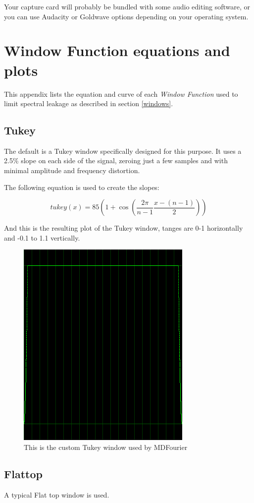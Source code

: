 \documentclass[10pt,a4paper]{report}
\begin{document}
\begin{appendices}
Your capture card will probably be bundled with some audio editing software, or you can use  Audacity\cite{audacity} or Goldwave\cite{goldwave} options depending on your operating system.

\chapter{Window Function equations and plots}
\label{windowfunctiondetails}

This appendix lists the equation and curve of each \textit{Window Function} used to limit spectral leakage as described in section \ref{windows}.

\newpage
\section{Tukey}

The default is a Tukey window specifically designed for this purpose. It uses a 2.5\% slope on each side of the signal, zeroing just a few samples and with minimal amplitude and frequency distortion.

The following equation is used to create the slopes:

\begin{equation}
tukey(x)=85(1+\cos(\frac{2\pi}{n-1}\frac{x-(n-1)}{2}))
\end{equation}

And this is the resulting plot of the Tukey window, tanges are 0-1 horizontally and -0.1 to 1.1 vertically.

\begin{figure}[H]
	\centering
	\includegraphics[width=0.4\linewidth]{plots/window-tukey.png}
	\caption[Tukey Window]{This is the custom Tukey window used by MDFourier}
	\label{fig:window-tukey}
\end{figure}

\newpage
\section{Flattop}
A typical Flat top window is used.


\end{appendices}
\end{document}
